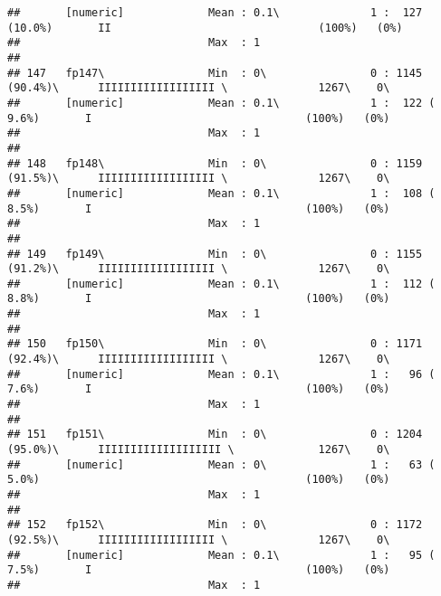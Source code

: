 \documentclass[]{article}
\begin{document}
\begin{verbatim}
##       [numeric]             Mean : 0.1\              1 :  127 (10.0%)       II                                (100%)   (0%)     
##                             Max  : 1                                                                                            
## 
## 147   fp147\                Min  : 0\                0 : 1145 (90.4%)\      IIIIIIIIIIIIIIIIII \              1267\    0\       
##       [numeric]             Mean : 0.1\              1 :  122 ( 9.6%)       I                                 (100%)   (0%)     
##                             Max  : 1                                                                                            
## 
## 148   fp148\                Min  : 0\                0 : 1159 (91.5%)\      IIIIIIIIIIIIIIIIII \              1267\    0\       
##       [numeric]             Mean : 0.1\              1 :  108 ( 8.5%)       I                                 (100%)   (0%)     
##                             Max  : 1                                                                                            
## 
## 149   fp149\                Min  : 0\                0 : 1155 (91.2%)\      IIIIIIIIIIIIIIIIII \              1267\    0\       
##       [numeric]             Mean : 0.1\              1 :  112 ( 8.8%)       I                                 (100%)   (0%)     
##                             Max  : 1                                                                                            
## 
## 150   fp150\                Min  : 0\                0 : 1171 (92.4%)\      IIIIIIIIIIIIIIIIII \              1267\    0\       
##       [numeric]             Mean : 0.1\              1 :   96 ( 7.6%)       I                                 (100%)   (0%)     
##                             Max  : 1                                                                                            
## 
## 151   fp151\                Min  : 0\                0 : 1204 (95.0%)\      IIIIIIIIIIIIIIIIIII \             1267\    0\       
##       [numeric]             Mean : 0\                1 :   63 ( 5.0%)                                         (100%)   (0%)     
##                             Max  : 1                                                                                            
## 
## 152   fp152\                Min  : 0\                0 : 1172 (92.5%)\      IIIIIIIIIIIIIIIIII \              1267\    0\       
##       [numeric]             Mean : 0.1\              1 :   95 ( 7.5%)       I                                 (100%)   (0%)     
##                             Max  : 1                                                                                            

\end{verbatim}
\end{document}
